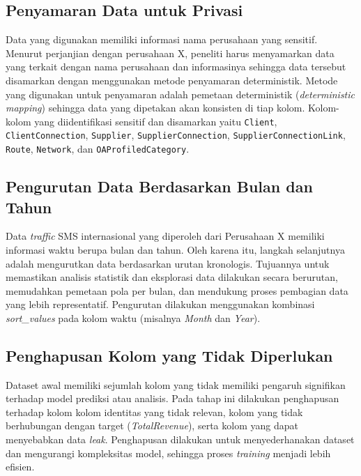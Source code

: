     \subsection{Penyamaran Data untuk Privasi}\label{}
    Data yang digunakan memiliki informasi nama perusahaan yang sensitif. Menurut perjanjian dengan perusahaan X, peneliti harus menyamarkan data yang terkait dengan nama perusahaan dan informasinya sehingga data tersebut disamarkan dengan menggunakan metode penyamaran deterministik. Metode yang digunakan untuk penyamaran adalah pemetaan deterministik (\textit{deterministic mapping}) sehingga data yang dipetakan akan konsisten di tiap kolom. Kolom-kolom yang diidentifikasi sensitif dan disamarkan yaitu \texttt{Client}, \texttt{ClientConnection}, \texttt{Supplier}, \texttt{SupplierConnection}, \texttt{SupplierConnectionLink}, \texttt{Route}, \texttt{Network}, dan \texttt{OAProfiledCategory}.
    
    \subsection{Pengurutan Data Berdasarkan Bulan dan Tahun}\label{}
    
    Data \textit{traffic} SMS internasional yang diperoleh dari Perusahaan X memiliki informasi waktu berupa bulan dan tahun. Oleh karena itu, langkah selanjutnya adalah mengurutkan data berdasarkan urutan kronologis. Tujuannya untuk memastikan analisis statistik dan eksplorasi data dilakukan secara berurutan, memudahkan pemetaan pola per bulan, dan mendukung proses pembagian data yang lebih representatif. Pengurutan dilakukan menggunakan kombinasi \textit{sort\_values} pada kolom waktu (misalnya \textit{Month} dan \textit{Year}).
    
    \subsection{Penghapusan Kolom yang Tidak Diperlukan}\label{} 
    
    Dataset awal memiliki sejumlah kolom yang tidak memiliki pengaruh signifikan terhadap model prediksi atau analisis. Pada tahap ini dilakukan penghapusan terhadap kolom kolom identitas yang tidak relevan, kolom yang tidak berhubungan dengan target (\textit{TotalRevenue}), serta kolom yang dapat menyebabkan data \textit{leak}. Penghapusan dilakukan untuk menyederhanakan dataset dan mengurangi kompleksitas model, sehingga proses \textit{training} menjadi lebih efisien.
    

